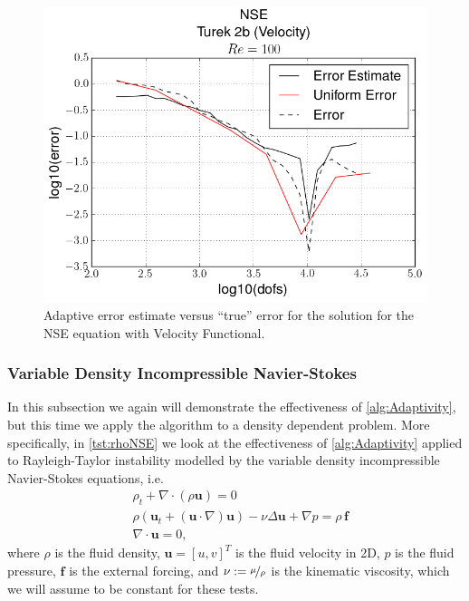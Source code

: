 \begin{test}
    \begin{figure}[h]
        \centering
        \includegraphics[scale=0.5]{Figures/AdaptiveNSEVelocityRe100.png}
        \caption{Adaptive error estimate versus ``true'' error for the solution
            for the NSE equation with Velocity Functional.}
        \label{fig:NSEVelocity_err}
    \end{figure}

\end{test}

\subsubsection{Variable Density Incompressible Navier-Stokes}

In this subsection we again will demonstrate the effectiveness of
\autoref{alg:Adaptivity}, but this time we apply the algorithm to a density
dependent problem. More specifically, in \autoref{tst:rhoNSE} we look at the
effectiveness of \autoref{alg:Adaptivity} applied to Rayleigh-Taylor instability
modelled by the variable density incompressible Navier-Stokes equations, i.e.
\begin{equation}
    \begin{split}
        &\rho_t + \nabla \cdot \left( \rho \mathbf{u} \right) = 0 \\
        &\rho \left( \mathbf{u}_t
            + \left( \mathbf{u}\cdot \nabla \right) \mathbf{u} \right)
            - \nu \Delta \mathbf{u} + \nabla p = \rho\, \mathbf{f} \\
        &\nabla \cdot \mathbf{u} = 0,
    \end{split}
    \label{eq:DensityNSE}
\end{equation}
where $\rho$ is the fluid density, $\mathbf{u} = \left[ u, v \right]^T$ is the
fluid velocity in 2D, $p$ is the fluid pressure, $\mathbf{f}$ is the
external forcing, and $\nu := \nicefrac{\mu}{\rho}$ is the kinematic viscosity,
which we will assume to be constant for these tests.

